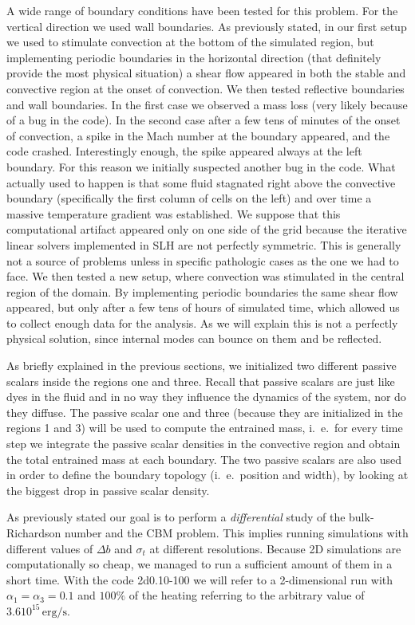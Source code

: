 A wide range of boundary conditions have been tested for this problem. For the vertical direction we used wall boundaries. As previously stated, in our first setup we used to stimulate convection at the bottom of the simulated region, but implementing periodic boundaries in the horizontal direction (that definitely provide the most physical situation) a shear flow appeared in both the stable and convective region at the onset of convection. We then tested reflective boundaries and wall boundaries. In the first case we observed a mass loss (very likely because of a bug in the code). In the second case after a few tens of minutes of the onset of convection, a spike in the Mach number at the boundary appeared, and the code crashed. Interestingly enough, the spike appeared always at the left boundary. For this reason we initially suspected another bug in the code. What actually used to happen is that some fluid stagnated right above the convective boundary (specifically the first column of cells on the left) and over time a massive temperature gradient was established. We suppose that this computational artifact appeared only on one side of the grid because the iterative linear solvers implemented in SLH are not perfectly symmetric. This is generally not a source of problems unless in specific pathologic cases as the one we had to face. We then tested a new setup, where convection was stimulated in the central region of the domain. By implementing periodic boundaries the same shear flow appeared, but only after a few tens of hours of simulated time, which allowed us to collect enough data for the analysis. As we will explain this is not a perfectly physical solution, since internal modes can bounce on them and be reflected.


As briefly explained in the previous sections, we initialized two different passive scalars inside the regions one and three. Recall that passive scalars are just like dyes in the fluid and in no way they influence the dynamics of the system, nor do they diffuse. The passive scalar one and three (because they are initialized in the regions 1 and 3) will be used to compute the entrained mass, i.\ e.\ for every time step we integrate the passive scalar densities in the convective region and obtain the total entrained mass at each boundary. The two passive scalars are also used in order to define the boundary topology (i.\ e.\  position and width), by looking at the biggest drop in passive scalar density.

As previously stated our goal is to perform a \textit{differential} study of the bulk-Richardson number and the CBM problem. This implies running simulations with different values of $\Delta b$ and $\sigma_t$ at different resolutions. Because 2D simulations are computationally so cheap, we managed to run a  sufficient amount of them in a short time. With the code 2d0.10-100 we will refer to a 2-dimensional run with $\alpha_{1} = \alpha_{3}=0.1$ and $100 \%$ of the heating referring to the arbitrary value of $3.6 10^{15} \, \mathrm{erg/s}$.

